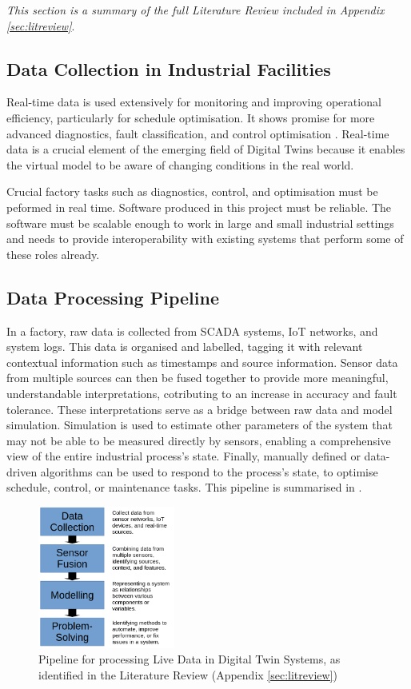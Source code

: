 \textit{This section is a summary of the full Literature Review included in Appendix \ref{sec:litreview}}.


\subsection{Data Collection in Industrial Facilities}

Real-time data is used extensively for monitoring and improving operational efficiency, particularly for schedule optimisation. It shows promise for more advanced diagnostics, fault classification, and control optimisation \cite{udugamaRoleBigData2020}. Real-time data is a crucial element of the emerging field of Digital Twins because it enables the virtual model to be aware of changing conditions in the real world.

Crucial factory tasks such as diagnostics, control, and optimisation must be peformed in real time. Software produced in this project must be reliable.
The software must be scalable enough to work in large and small industrial settings and needs to provide interoperability with existing systems that perform some of these roles already.


\subsection{Data Processing Pipeline}

In a factory, raw data is collected from SCADA systems, IoT networks, and system logs. 
This data is organised and labelled, tagging it with relevant contextual information such as timestamps and source information. Sensor data from multiple sources can then be fused together to provide more meaningful, understandable interpretations, cotributing to an increase in accuracy and fault tolerance. 
These interpretations serve as a bridge between raw data and model simulation. Simulation is used to estimate other parameters of the system that may not be able to be measured directly by sensors, enabling a comprehensive view of the entire industrial process's state. 
Finally, manually defined or data-driven algorithms can be used to respond to the process's state, to optimise schedule, control, or maintenance tasks. 
This pipeline is summarised in .

\begin{figure}[h]
    \centering
    \includegraphics[width=0.4\textwidth]{LR_summary.png}
    \caption{Pipeline for processing Live Data in Digital Twin Systems, as identified in the Literature Review (Appendix \ref{sec:litreview})}
    \label{fig:processing_pipeline}
\end{figure}

